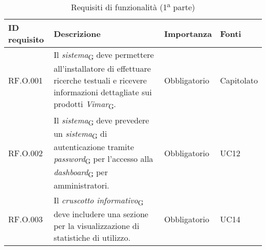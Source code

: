 \begin{table}[H]
\centering
    \begin{tabular}{|C{2.7cm}|L{7.2cm}|C{2.7cm}|C{2cm}|}
        \hline
        \textbf{ID requisito} & \textbf{Descrizione} & \textbf{Importanza} & \textbf{Fonti}  \\
        \hline
        RF.O.001 & Il \textit{sistema}\textsubscript{G} deve permettere all'installatore di effettuare ricerche testuali e ricevere informazioni dettagliate sui prodotti \textit{Vimar}\textsubscript{G}. & Obbligatorio & Capitolato \\
        \hline
        RF.O.002 & Il \textit{sistema}\textsubscript{G} deve prevedere un \textit{sistema}\textsubscript{G} di autenticazione tramite \textit{password}\textsubscript{G} per l'accesso alla \textit{dashboard}\textsubscript{G} per amministratori. & Obbligatorio & UC12 \\
        \hline
        RF.O.003 & Il \textit{cruscotto informativo}\textsubscript{G} deve includere una sezione per la visualizzazione di statistiche di utilizzo. & Obbligatorio & UC14 \\
        \hline
    \end{tabular}
    \caption{Requisiti di funzionalità (1\textsuperscript{a}  parte)}
\end{table}
